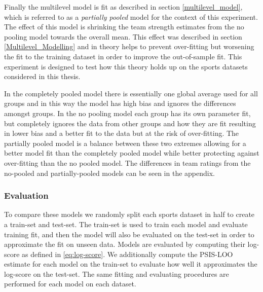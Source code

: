 Finally the multilevel model is fit as described in section \ref{multilevel_model}, which is referred to as a \textit{partially pooled} model for the context of this experiment. The effect of this model is shrinking the team strength estimates from the no pooling model towards the overall mean. This effect was described in section \ref{Multilevel_Modelling} and in theory helps to prevent over-fitting but worsening the fit to the training dataset in order to improve the out-of-sample fit. This experiment is designed to test how this theory holds up on the sports datasets considered in this thesis.

In the completely pooled model there is essentially one global average used for all groups and in this way the model has high bias and ignores the differences amongst groups. In the no pooling model each group has its own parameter fit, but completely ignores the data from other groups and how they are fit resulting in lower bias and a better fit to the data but at the risk of over-fitting. The partially pooled model is a balance between these two extremes allowing for a better model fit than the completely pooled model while better protecting against over-fitting than the no pooled model. The differences in team ratings from the no-pooled and partially-pooled models can be seen in the appendix.

\subsubsection*{Evaluation}

To compare these models we randomly split each sports dataset in half to create a train-set and test-set. The train-set is used to train each model and evaluate training fit, and then the model will also be evaluated on the test-set in order to approximate the fit on unseen data. Models are evaluated by computing their log-score as defined in \ref{eq:log-score}. We additionally compute the PSIS-LOO estimate for each model on the train-set to evaluate how well it approximates the log-score on the test-set. The same fitting and evaluating procedures are performed for each model on each dataset.

